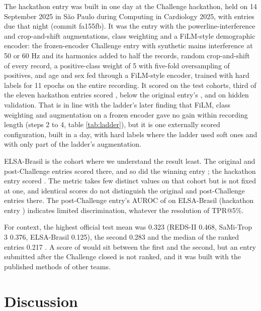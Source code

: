 \documentclass{iopjournal}
\makeatletter
\newcommand{\tpr}{TPR@5\%}
\makeatother
\begin{document}
The hackathon entry was built in one day at the Challenge hackathon, held on 14 September 2025 in S\~ao Paulo during Computing in Cardiology 2025, with entries due that night (commit fa155fb). It was the entry with the powerline-interference and crop-and-shift augmentations, class weighting and a FiLM-style demographic encoder: the frozen-encoder Challenge entry with synthetic mains interference at 50 or 60 Hz and its harmonics added to half the records, random crop-and-shift of every record, a positive-class weight of 5 with five-fold oversampling of positives, and age and sex fed through a FiLM-style encoder, trained with hard labels for 11 epochs on the entire recording. It scored \extHackMean{} on the test cohorts, third of the eleven hackathon entries scored \citep{physionet2025hackathon}, below the original entry's \extOrigMean, and \extHackVal{} on hidden validation. That is in line with the ladder's later finding that FiLM, class weighting and augmentation on a frozen encoder gave no gain within recording length (steps 2 to 4, table \ref{tab:ladder}), but it is one externally scored configuration, built in a day, with hard labels where the ladder used soft ones and with only part of the ladder's augmentation.

ELSA-Brasil is the cohort where we understand the result least. The original and post-Challenge entries scored \extNewElsa{} there, and so did the winning entry \citep{physionet2025results}; the hackathon entry scored \extHackElsa. The metric takes few distinct values on that cohort but is not fixed at one, and identical scores do not distinguish the original and post-Challenge entries there. The post-Challenge entry's AUROC of \extNewElsaAuc{} on ELSA-Brasil (hackathon entry \extHackElsaAuc) indicates limited discrimination, whatever the resolution of \tpr.

For context, the highest official test mean was 0.323 (REDS-II 0.468, SaMi-Trop 3 0.376, ELSA-Brasil 0.125), the second 0.283 and the median of the ranked entries 0.217 \citep{reyna2025,physionet2025results}.
A score of \extNewMean{} would sit between the first and the second, but an entry submitted after the Challenge closed is not ranked, and it was built with the published methods of other teams.

\section{Discussion}
\end{document}
